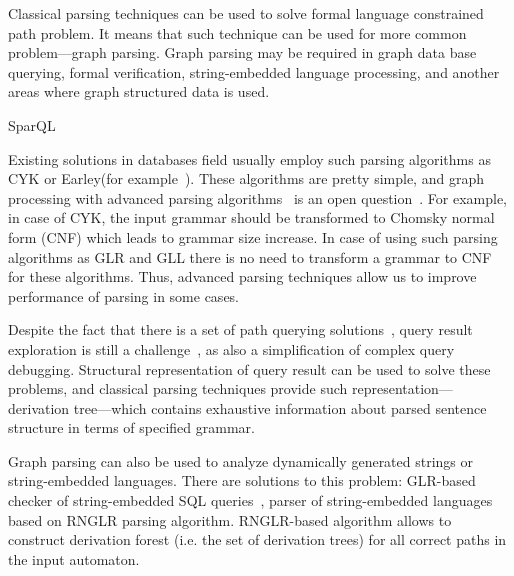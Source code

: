 \documentclass[runningheads,a4paper]{llncs}
\begin{document}
Classical parsing techniques can be used to solve formal language constrained path problem.
It means that such technique can be used for more common problem---graph parsing. 
Graph parsing may be required in graph data base querying, formal verification, string-embedded language processing, and another areas where graph structured data is used. 

SparQL

Existing solutions in databases field usually employ such parsing algorithms as CYK or Earley(for example~\cite{ConjCFPathQuery,CFGonRDF,GraphQueryWithEarley}). 
These algorithms are pretty simple, and graph processing with advanced parsing algorithms~\cite{Grune} is an open question~\cite{Hellings16}.
For example, in case of CYK, the input grammar should be transformed to Chomsky normal form (CNF) which leads to grammar size increase.
In case of using such parsing algorithms as GLR and GLL there is no need to transform a grammar to CNF for these algorithms.
Thus, advanced parsing techniques allow us to improve performance of parsing in some cases.

Despite the fact that there is a set of path querying solutions~\cite{GraphQueryWithEarley,ConjCFPathQuery,QueryGraphWithData,RegularDBQuery}, query result exploration is still a challenge~\cite{hofman2015separabilityForRegQueryDebugging}, as also a simplification of complex query debugging.
Structural representation of query result can be used to solve these problems, and classical parsing techniques provide such representation---derivation tree---which contains exhaustive information about parsed sentence structure in terms of specified grammar.

Graph parsing can also be used to analyze dynamically generated strings or string-embedded languages. 
There are solutions to this problem: GLR-based checker of string-embedded SQL queries~\cite{Alvor1,Alvor2}, parser of string-embedded languages~\cite{relaxedRNGLR} based on RNGLR parsing algorithm.
RNGLR-based algorithm allows to construct derivation forest (i.e. the set of derivation trees) for all correct paths in the input automaton.
\end{document}
